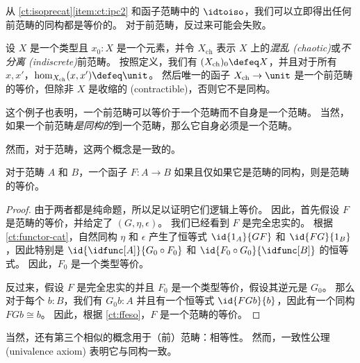 从 \cref{ct:isoprecat}\ref{item:ct:ipc2} 和函子范畴中的 $\idtoiso$，我们可以立即得出任何前范畴的同构都是等价的。
对于前范畴，反过来可能会失败。

\begin{eg}\label{ct:chaotic}
设 $X$ 是一个类型且 $x_0:X$ 是一个元素，并令 $X_{\mathrm{ch}}$ 表示 $X$ 上的\emph{混乱 (chaotic)}或\emph{不分离 (indiscrete)}前范畴。
按照定义，我们有 $(X_{\mathrm{ch}})_0\defeq X$，并且对于所有 $x,x'$，$\hom_{X_{\mathrm{ch}}}(x,x') \defeq \unit$。
然后唯一的函子 $X_{\mathrm{ch}}\to \unit$ 是一个前范畴的等价，但除非 $X$ 是收缩的 (contractible)，否则它不是同构。

这个例子也表明，一个前范畴可以等价于一个范畴而不自身是一个范畴。
当然，如果一个前范畴\emph{是同构的}到一个范畴，那么它自身必须是一个范畴。
\end{eg}

然而，对于范畴，这两个概念是一致的。

\begin{lem}\label{ct:eqv-levelwise}
对于范畴 $A$ 和 $B$，一个函子 $F:A\to B$ 如果且仅如果它是范畴的同构，则是范畴的等价。
\end{lem}
\begin{proof}
  由于两者都是纯命题，所以足以证明它们逻辑上等价。
  因此，首先假设 $F$ 是范畴的等价，并给定了 $(G,\eta,\epsilon)$。
  我们已经看到 $F$ 是完全忠实的。
  根据 \cref{ct:functor-cat}，自然同构 $\eta$ 和 $\epsilon$ 产生了恒等式 $\id{1_A}{GF}$ 和 $\id{FG}{1_B}$，因此特别是 $\id{\idfunc[A]}{G_0\circ F_0}$ 和 $\id{F_0\circ G_0}{\idfunc[B]}$ 的恒等式。
  因此，$F_0$ 是一个类型等价。

  反过来，假设 $F$ 是完全忠实的并且 $F_0$ 是一个类型等价，假设其逆元是 $G_0$。
  那么对于每个 $b:B$，我们有 $G_0 b:A$ 并且有一个恒等式 $\id{FGb}{b}$，因此有一个同构 $FGb\cong b$。
  因此，根据 \cref{ct:ffeso}，$F$ 是一个范畴的等价。
\end{proof}

当然，还有第三个相似的概念用于（前）范畴：相等性。
然而，一致性公理 (univalence axiom) 表明它与同构一致。

